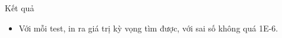 Kết quả
\begin{itemize}
	\item     Với mỗi test, in ra giá trị kỳ vọng tìm được, với sai số không quá 1E-6.   
\end{itemize}